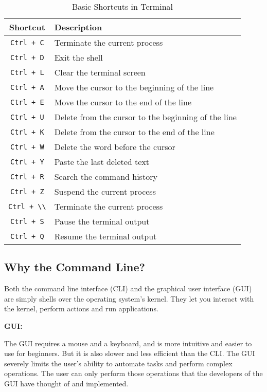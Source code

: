 \begin{table*}[h!]
\caption{Basic Shortcuts in Terminal}
\begin{tabular}{ c l }
  \toprule
 Shortcut & Description \\
 \midrule
  \lstinline|Ctrl + C| & Terminate the current process\\
  \lstinline|Ctrl + D| & Exit the shell \\
  \lstinline|Ctrl + L| & Clear the terminal screen \\
  \lstinline|Ctrl + A| & Move the cursor to the beginning of the line \\
  \lstinline|Ctrl + E| & Move the cursor to the end of the line \\
  \lstinline|Ctrl + U| & Delete from the cursor to the beginning of the line \\
  \lstinline|Ctrl + K| & Delete from the cursor to the end of the line \\
  \lstinline|Ctrl + W| & Delete the word before the cursor \\
  \lstinline|Ctrl + Y| & Paste the last deleted text \\
  \lstinline|Ctrl + R| & Search the command history \\
  \lstinline|Ctrl + Z| & Suspend the current process \\
  \lstinline|Ctrl + \\| & Terminate the current process \\
  \lstinline|Ctrl + S| & Pause the terminal output \\
  \lstinline|Ctrl + Q| & Resume the terminal output \\
  \bottomrule
\end{tabular}
\end{table*}


\subsection{Why the Command Line?}

Both the command line interface (CLI) and the graphical user interface (GUI) are simply shells over the operating system's kernel.
They let you interact with the kernel, perform actions and run applications.

\textbf{GUI:}

The GUI requires a mouse and a keyboard, and is more intuitive and easier to use for beginners.
But it is also slower and less efficient than the CLI.
The GUI severely limits the user's ability to automate tasks and perform complex operations.
The user can only perform those operations that the developers of the GUI have thought of and implemented.

